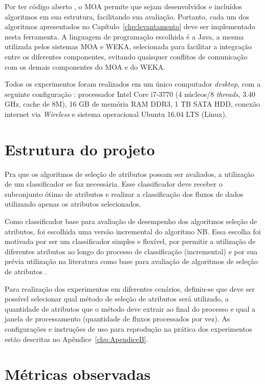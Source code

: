 Por 
ter código aberto
, o MOA permite que sejam desenvolvidos e incluídos algoritmos em sua estrutura, 
facilitando
sua avaliação. Portanto, cada um dos algoritmos apresentados no 
Capítulo~\ref{chp:levantamento}
deve ser implementado nesta ferramenta. A linguagem de programação escolhida é a Java, 
a
mesma utilizada pelos sistemas MOA e WEKA, 
selecionada
para facilitar a integração entre os diferentes componentes, evitando quaisquer conflitos de comunicação com os demais componentes do MOA e do WEKA. 

Todos os experimentos foram realizados em um único computador \textit{desktop}, com a seguinte 
configuração
: processador Intel Core i7-3770 (4 núcleos/8 \textit{threads}, 3.40 GHz, cache de 8M), 16 GB de memória RAM DDR3, 1 TB SATA HDD, conexão 
internet via \textit{Wireless} e sistema operacional Ubuntu 16.04 LTS (Linux).

\section{Estrutura do projeto}\label{sec:met_config}

Pra que os algoritmos de seleção de atributos possam ser avaliados, a utilização de um classificador se faz necessária. Esse classificador deve receber o subconjunto ótimo de atributos e realizar a classificação dos fluxos de dados utilizando apenas os atributos selecionados. 

Como classificador base para avaliação de desempenho dos algoritmos seleção de atributos, foi escolhida uma versão incremental do algoritmo NB. Essa escolha foi motivada por ser um classificador simples e flexível, por permitir a utilização de diferentes atributos ao longo do processo de classificação (incremental) e por sua prévia utilização na literatura como base para avaliação de algoritmos de seleção de atributos \cite{Ramirez-Gallego2017}.

Para realização dos experimentos em diferentes cenários, definiu-se que deve ser possível selecionar qual método de seleção de atributos será utilizado, a quantidade de atributos que o método deve extrair ao final do processo e qual a janela de processamento (quantidade de fluxos processados por vez). As configurações e instruções de uso para reprodução na prática dos experimentos estão descritas no Apêndice~\ref{chp:ApendiceB}.



\section{Métricas observadas}\label{sec:met_metricas} 

